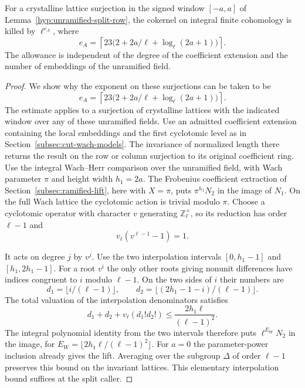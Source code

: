 \begin{proposition}\label{prop:unramified-split-finite-lift}
For a crystalline lattice surjection in the signed window
\([-a,a]\) of Lemma~\ref{hyp:unramified-split-row}, the cokernel on integral finite cohomology
is killed by \(\ell^{e_A}\), where
\[
 e_A=\left\lceil23\bigl(2+2a/\ell+\log_\ell(2a+1)\bigr)\right\rceil .
\]
The allowance is independent of the degree of the coefficient
extension and the number of embeddings of the unramified field.
\end{proposition}

\begin{proof}
We show why the exponent on these surjections can be taken to be
\[
 e_A=\left\lceil23\bigl(2+2a/\ell+\log_\ell(2a+1)\bigr)\right\rceil .
\]
The estimate applies to a surjection of crystalline lattices with
the indicated window over any of these unramified fields. Use an
admitted coefficient extension containing the local embeddings and
the first cyclotomic level as in Section~\ref{subsec:cut-wach-models}.
The invariance of normalized length there returns the result on the
row or column surjection to its original coefficient ring. Use the
integral Wach--Herr comparison over the unramified field, with
Wach parameter \(\pi\) and height width \(h_1=2a\).
The Frobenius coefficient extraction of
Section~\ref{subsec:ramified-lift}, here with \(X=\pi\), puts
\(\pi^{h_1}N_2\) in the image of \(N_1\). On the full Wach
lattice the cyclotomic action is trivial modulo \(\pi\).
Choose a cyclotomic operator with character \(v\) generating
\(\mathbb Z_\ell^\times\), so its reduction has order
\(\ell-1\) and
\[
 v_\ell(v^{\ell-1}-1)=1.
\]

It acts on degree \(j\) by \(v^j\). Use the two interpolation
intervals \([0,h_1-1]\) and \([h_1,2h_1-1]\).
For a root \(v^i\) the only other roots giving nonunit
differences have indices congruent to \(i\) modulo \(\ell-1\).
On the two sides of \(i\) their numbers are
\[
 d_1=\lfloor i/(\ell-1)\rfloor,\qquad
 d_2=\lfloor(2h_1-1-i)/(\ell-1)\rfloor.
\]
The total valuation of the interpolation denominators satisfies
\[
 d_1+d_2+v_\ell(d_1!d_2!)\le \frac{2h_1\ell}{(\ell-1)^2}.
\]
The integral polynomial identity from the two intervals therefore puts \(\ell^{E_W}N_2\) in the image, for
\(E_W=\lfloor2h_1\ell/(\ell-1)^2\rfloor\).
For \(a=0\) the parameter-power inclusion already gives the lift.
Averaging over the subgroup \(\Delta\) of order \(\ell-1\)
preserves this bound on the invariant lattices. This elementary
interpolation bound suffices at the split caller.


\end{proof}
